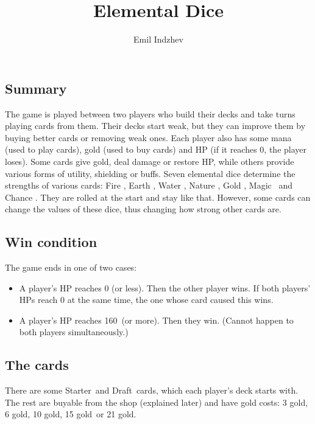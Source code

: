 \documentclass[dvipsnames,parskip,a4paper]{scrartcl}
\date{}
\title{Elemental Dice}
\author{Emil Indzhev}
\newcommand{\iconsize}{3.4mm}
\newcommand{\icondepth}{0.45mm}
\newcommand{\icon}[1]{\raisebox{-\icondepth}{\texttt{[image:  \#1 ]}}}
\newcommand{\fire}{\icon{icons/fire.png}}
\newcommand{\earth}{\icon{icons/earth.png}}
\newcommand{\water}{\icon{icons/water.png}}
\newcommand{\nature}{\icon{icons/nature.png}}
\newcommand{\magic}{\icon{icons/magic.png}}
\newcommand{\gold}{\icon{icons/gold.png}}
\newcommand{\chance}{\icon{icons/chance.png}}
\newcommand{\starter}{Starter}
\newcommand{\draft}{Draft}
\newcommand{\onecost}{3 gold}
\newcommand{\twocost}{6 gold}
\newcommand{\threecost}{10 gold}
\newcommand{\fourcost}{15 gold}
\newcommand{\fivecost}{21 gold}
\newcommand{\maxhp}{160}
\begin{document}

\subsection*{Summary}

The game is played between two players who build their decks and take turns playing cards from them. Their decks start weak, but they can improve them by buying better cards or removing weak ones. Each player also has some mana (used to play cards), gold (used to buy cards) and HP (if it reaches 0, the player loses). Some cards give gold, deal damage or restore HP, while others provide various forms of utility, shielding or buffs. Seven elemental dice determine the strengths of various cards: Fire \fire, Earth \earth, Water \water, Nature \nature, Gold \gold, Magic \magic \ and Chance \chance. They are rolled at the start and stay like that. However, some cards can change the values of these dice, thus changing how strong other cards are.

\subsection*{Win condition}

The game ends in one of two cases:

\begin{itemize}
\item A player's HP reaches 0 (or less). Then the other player wins. If both players' HPs reach 0 at the same time, the one whose card caused this wins.
\item A player's HP reaches \maxhp \ (or more). Then they win. (Cannot happen to both players simultaneously.)
\end{itemize}

\subsection*{The cards}

There are some \starter \ and \draft \ cards, which each player's deck starts with. The rest are buyable from the shop (explained later) and have gold costs: \onecost, \twocost, \threecost, \fourcost \ or \fivecost.

\vspace{4pt}
\end{document}
